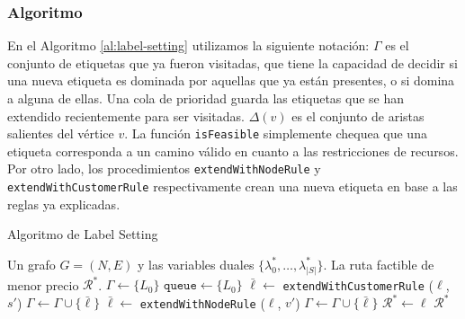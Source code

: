 \subsubsection{Algoritmo}

En el Algoritmo \ref{al:label-setting} utilizamos la siguiente notación: $\Gamma$ es el conjunto de etiquetas que ya fueron visitadas, que tiene la capacidad de decidir si una nueva etiqueta es dominada por aquellas que ya están presentes, o si domina a alguna de ellas. Una cola de prioridad guarda las etiquetas que se han extendido recientemente para ser visitadas. $\Delta(v)$ es el conjunto de aristas salientes del vértice $v$. La función \texttt{isFeasible} simplemente chequea que una etiqueta corresponda a un camino válido en cuanto a las restricciones de recursos. Por otro lado, los procedimientos \texttt{extendWithNodeRule} y \texttt{extendWithCustomerRule} respectivamente crean una nueva etiqueta en base a las reglas ya explicadas.

\begin{breakablealgorithm}
  \caption{Algoritmo de Label Setting}
  \label{al:label-setting}
  \begin{algorithmic}[1]
  	\Require Un grafo $G = (N, E)$ y las variables duales $\{\lambda^*_0, \dots, \lambda^*_{|S|}\}$.
  	\Ensure La ruta factible de menor precio $\mathscr{R}^{*}$.
        \State $\Gamma \gets \{L_0\}$
        \State $\texttt{queue} \gets \{L_0\}$
                    \State $\bar{\ell} \gets $ \texttt{extendWithCustomerRule} ($\ell$, $s'$)
                        \State $\Gamma \gets \Gamma \cup \{\bar{\ell}\}$
                    \EndIf
                \EndFor
                    \State $\bar{\ell} \gets $ \texttt{extendWithNodeRule} ($\ell$, $v'$)
                        \State $\Gamma \gets \Gamma \cup \{\bar{\ell}\}$
                    \EndIf
                \EndFor
            \EndIf
        \EndWhile
                \State $\mathscr{R}^{*} \gets \ell$
            \EndIf
        \EndFor
        \Return $\mathscr{R}^{*}$
  \end{algorithmic}
\end{breakablealgorithm}


